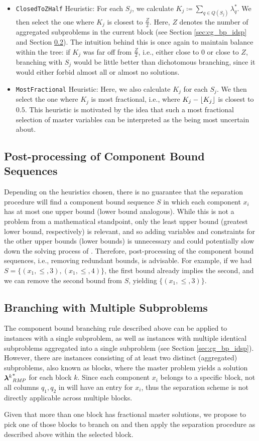\begin{itemize}
\item	\texttt{ClosedToZHalf} Heuristic: For each $S_j$, we calculate $K_j \coloneqq \sum_{q \in Q(S_j)} \lambda_q^*$. We then select the one where $K_j$ is closest to $\frac{Z}{2}$. Here, $Z$ denotes the number of aggregated subproblems in the current block (see Section \ref{sec:cg_bp_idsp} and Section \ref{sec:cmpbnd_separation_branching}). The intuition behind this is once again to maintain balance within the tree: if $K_j$ was far off from $\frac{Z}{2}$, i.e., either close to $0$ or close to $Z$, branching with $S_j$ would be little better than dichotomous branching, since it would either forbid almost all or almost no solutions.
\item	\texttt{MostFractional} Heuristic: Here, we also calculate $K_j$ for each $S_j$. We then select the one where $K_j$ is most fractional, i.e., where $K_j - \lfloor K_j\rfloor$ is closest to $0.5$. This heuristic is motivated by the idea that such a most fractional selection of master variables can be interpreted as the \RMP{} being most uncertain about.
\end{itemize}

\subsection{Post-processing of Component Bound Sequences}\label{sec:cmpbnd_separation_postprocessing}
Depending on the heuristics chosen, there is no guarantee that the separation procedure will find a component bound sequence $S$ in which each component $x_i$ has at most one upper bound (lower bound analogous). While this is not a problem from a mathematical standpoint, only the least upper bound (greatest lower bound, respectively) is relevant, and so adding variables and constraints for the other upper bounds (lower bounds) is unnecessary and could potentially slow down the solving process of \SP{}. Therefore, post-processing of the component bound sequences, i.e., removing redundant bounds, is advisable. For example, if we had $S = \{(x_1, \leq, 3), (x_1, \leq, 4)\}$, the first bound already implies the second, and we can remove the second bound from $S$, yielding $\{(x_1, \leq, 3)\}$.

\subsection{Branching with Multiple Subproblems}\label{sec:cmpbnd_separation_branching}
The component bound branching rule described above can be applied to instances with a single subproblem, as well as instances with multiple identical subproblems aggregated into a single subproblem (see Section \ref{sec:cg_bp_idsp}). However, there are instances consisting of at least two distinct (aggregated) subproblems, also known as blocks, where the master problem yields a solution ${{\bm{\lambda}}^k}^*_{\textit{RMP}}{}$ for each block $k$. Since each component $x_i$ belongs to a specific block, not all columns $q_1, q_2$ in \RMP{} will have an entry for $x_i$, thus the separation scheme is not directly applicable across multiple blocks.

Given that more than one block has fractional master solutions, we propose to pick one of those blocks to branch on and then apply the separation procedure as described above within the selected block.
